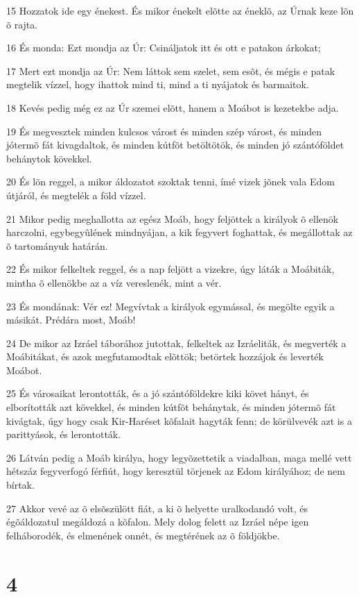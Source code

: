 \par 15 Hozzatok ide egy énekest. És mikor énekelt elõtte az éneklõ, az Úrnak keze lõn õ rajta.
\par 16 És monda: Ezt mondja az Úr: Csináljatok itt és ott e patakon árkokat;
\par 17 Mert ezt mondja az Úr: Nem láttok sem szelet, sem esõt, és mégis e patak megtelik vízzel, hogy ihattok mind ti, mind a ti nyájatok és barmaitok.
\par 18 Kevés pedig még ez az Úr szemei elõtt, hanem a Moábot is kezetekbe adja.
\par 19 És megvesztek minden kulcsos várost és minden szép várost, és minden jótermõ fát kivagdaltok, és minden kútfõt betöltötök, és minden jó szántóföldet behánytok kövekkel.
\par 20 És lõn reggel, a mikor áldozatot szoktak tenni, ímé vizek jõnek vala Edom útjáról, és megtelék a föld vízzel.
\par 21 Mikor pedig meghallotta az egész Moáb, hogy feljöttek a királyok õ ellenök harczolni, egybegyûlének mindnyájan, a kik fegyvert foghattak, és megállottak az õ tartományuk határán.
\par 22 És mikor felkeltek reggel, és a nap feljött a vizekre, úgy láták a Moábiták, mintha õ ellenökbe az a víz vereslenék, mint a vér.
\par 23 És mondának: Vér ez! Megvívtak a királyok egymással, és megölte egyik a másikát. Prédára most, Moáb!
\par 24 De mikor az Izráel táborához jutottak, felkeltek az Izráeliták, és megverték a Moábitákat, és azok megfutamodtak elõttök; betörtek hozzájok és leverték Moábot.
\par 25 És városaikat lerontották, és a jó szántóföldekre kiki követ hányt, és elborították azt kövekkel, és minden kútfõt behánytak, és minden jótermõ fát kivágtak, úgy hogy csak Kir-Haréset kõfalait hagyták fenn; de körülvevék azt is a parittyások, és lerontották.
\par 26 Látván pedig a Moáb királya, hogy legyõzettetik a viadalban, maga mellé vett hétszáz fegyverfogó férfiút, hogy keresztül törjenek az Edom királyához; de nem bírtak.
\par 27 Akkor vevé az õ elsõszülött fiát, a ki õ helyette uralkodandó volt, és égõáldozatul megáldozá a kõfalon. Mely dolog felett az Izráel népe igen felháborodék, és elmenének onnét, és megtérének az õ földjökbe.

\chapter{4}

